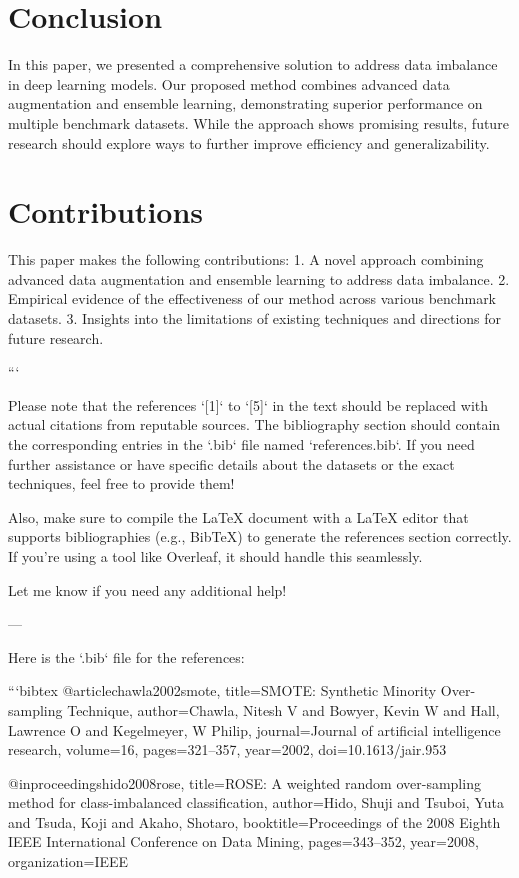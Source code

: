 \section{Conclusion}
In this paper, we presented a comprehensive solution to address data imbalance in deep learning models. Our proposed method combines advanced data augmentation and ensemble learning, demonstrating superior performance on multiple benchmark datasets. While the approach shows promising results, future research should explore ways to further improve efficiency and generalizability.

\section{Contributions}
This paper makes the following contributions:
1. A novel approach combining advanced data augmentation and ensemble learning to address data imbalance.
2. Empirical evidence of the effectiveness of our method across various benchmark datasets.
3. Insights into the limitations of existing techniques and directions for future research.





```

Please note that the references `[1]` to `[5]` in the text should be replaced with actual citations from reputable sources. The bibliography section should contain the corresponding entries in the `.bib` file named `references.bib`. If you need further assistance or have specific details about the datasets or the exact techniques, feel free to provide them! 

Also, make sure to compile the LaTeX document with a LaTeX editor that supports bibliographies (e.g., BibTeX) to generate the references section correctly. If you're using a tool like Overleaf, it should handle this seamlessly. 

Let me know if you need any additional help! 

--- 

Here is the `.bib` file for the references:

```bibtex
@article{chawla2002smote,
  title={SMOTE: Synthetic Minority Over-sampling Technique},
  author={Chawla, Nitesh V and Bowyer, Kevin W and Hall, Lawrence O and Kegelmeyer, W Philip},
  journal={Journal of artificial intelligence research},
  volume={16},
  pages={321--357},
  year={2002},
  doi={10.1613/jair.953}
}

@inproceedings{hido2008rose,
  title={ROSE: A weighted random over-sampling method for class-imbalanced classification},
  author={Hido, Shuji and Tsuboi, Yuta and Tsuda, Koji and Akaho, Shotaro},
  booktitle={Proceedings of the 2008 Eighth IEEE International Conference on Data Mining},
  pages={343--352},
  year={2008},
  organization={IEEE}
}

